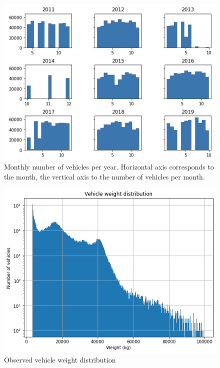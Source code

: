 \documentclass[10pt,conference,compsocconf]{IEEEtran}
\begin{document}
\begin{figure}[ht]
  \includegraphics[scale = 0.63]{report/img/monthly-number-vehicles-per-year.png}
  \caption{Monthly number of vehicles per year. Horizontal axis corresponds to the month, the vertical axis to the number of vehicles per month.}
  \label{monthly-number-of-vehicles-per-year}
\end{figure}

\begin{figure}[h!]
    \centering
    \includegraphics[scale=0.45]{report/img/weight-distribution.png}
    \caption{Observed vehicle weight distribution}
    \label{weight-distribution}
\end{figure}
\end{document}
